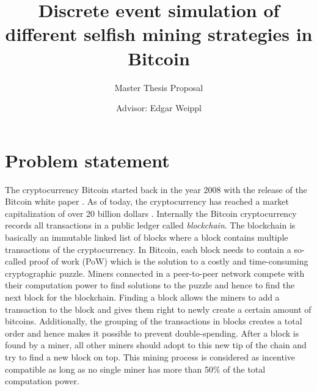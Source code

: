 \documentclass{scrartcl}
\title{Discrete event simulation of different selfish mining strategies in Bitcoin}
\subtitle{Master Thesis Proposal}
\author{Advisor: Edgar Weippl}
\begin{document}
\maketitle

\section{Problem statement}
The cryptocurrency Bitcoin started back in the year 2008 with the release of the Bitcoin white paper \cite{nakamoto2008bitcoin}.
As of today, the cryptocurrency has reached a market capitalization of over 20 billion dollars \cite{marketcap2017}.
Internally the Bitcoin cryptocurrency records all transactions in a public ledger called \emph{blockchain}.
The blockchain is basically an immutable linked list of blocks where a block contains multiple transactions of the cryptocurrency.
In Bitcoin, each block needs to contain a so-called proof of work (PoW) which is the solution to a costly and time-consuming cryptographic puzzle.
Miners connected in a peer-to-peer network compete with their computation power to find solutions to the puzzle and hence to find the next block for the blockchain.
Finding a block allows the miners to add a transaction to the block and gives them right to newly create a certain amount of bitcoins.
Additionally, the grouping of the transactions in blocks creates a total order and hence makes it possible to prevent double-spending.
After a block is found by a miner, all other miners should adopt to this new tip of the chain and try to find a new block on top.
This mining process is considered as incentive compatible as long as no single miner has more than 50\% of the total computation power.
\end{document}
